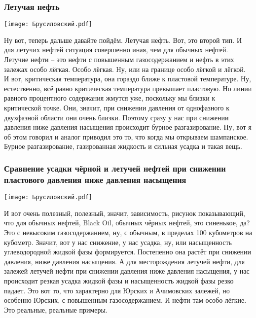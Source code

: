 \documentclass[main.tex]{subfiles}
\begin{document}
\subsubsection{Летучая нефть}

\begin{center}
\texttt{[image: Брусиловский.pdf]}
\end{center}

Ну вот, теперь дальше давайте пойдём.
Летучая нефть.
Вот, это второй тип.
И для летучих нефтей ситуация совершенно иная, чем для обычных нефтей.
Летучие нефти -- это нефти с повышенным газосодержанием и нефть в этих залежах особо лёгкая.
Особо лёгкая.
Ну, или на границе особо лёгкой и лёгкой.
И вот, критическая температура, она гораздо ближе к пластовой температуре.
Ну, естественно, всё равно критическая температура превышает пластовую.
Но линии равного процентного содержания жмутся уже, поскольку мы близки к критической точке.
Они, значит, при снижении давления от однофазного к двухфазной области они очень близки.
Поэтому сразу у нас при снижении давления ниже давления насыщения происходит бурное разгазирование.
Ну, вот я об этом говорил и аналог приводил это то, что когда мы открываем шампанское.
Бурное разгазирование, газированная жидкость и сильная усадка и такая вещь.

\subsubsection{Сравнение усадки чёрной и летучей нефтей при снижении пластового давления ниже давления насыщения}

\begin{center}
\texttt{[image: Брусиловский.pdf]}
\end{center}

И вот очень полезный, полезный, значит, зависимость, рисунок показывающий, что для обычных нефтей, Black Oil, обычных чёрных нефтей, это синенькое, да?
Это с невысоким газосодержанием, ну, с обычным, в пределах 100 кубометров на кубометр.
Значит, вот у нас снижение, у нас усадка, ну, или насыщенность углеводородной жидкой фазы формируется.
Постепенно она растёт при снижении давления, ниже давления насыщения.
А для месторождения летучей нефти, для залежей летучей нефти при снижении давления ниже давления насыщения, у нас происходит резкая усадка жидкой фазы и насыщенность жидкой фазы резко падает.
Это вот то, что характерно для Юрских и Ачимовских залежей, но особенно Юрских, с повышенным газосодержанием.
И нефти там особо лёгкие. Это реальные, реальные примеры.
\end{document}
